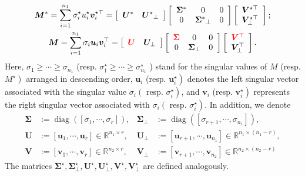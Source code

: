 \documentclass[override]{beamer} %
\theoremstyle{remark}
\newcommand{\bs}[1]{{\boldsymbol{#1}^*}}
\newcommand{\bb}[1]{{\boldsymbol {#1}}}
\def\red{\textcolor{red}}
\begin{document}
\begin{frame}
$$
\begin{gathered}
\bs M=\sum_{i=1}^{n_1} \sigma_i^{\star} u_i^{\star} \boldsymbol{v}_i^{\star \top}=\left[\begin{array}{ll}
\bs U & \bs U_{\perp}
\end{array}\right]\left[\begin{array}{ccc}
\bs \Sigma & 0 & 0 \\
0 & \bs \Sigma_{\perp}& 0
\end{array}\right]\left[\begin{array}{c}
\boldsymbol{V}^{\star \top} \\
\boldsymbol{V}_{\perp}^{\star \top}
\end{array}\right] ; \\
\bb M=\sum_{i=1}^{n_1} \sigma_i \boldsymbol{u}_i \boldsymbol{v}_i^{\top}=\left[\begin{array}{ll} \red{\bb U} & \bb U_{\perp}
\end{array}\right]\left[\begin{array}{ccc}
\red{\bb \Sigma} & 0 & 0 \\
0 & \boldsymbol{\Sigma}_{\perp} & 0
\end{array}\right]\left[\begin{array}{c}
\red{\boldsymbol{V}^{\top}} \\
\boldsymbol{V}_{\perp}^{\top}
\end{array}\right] .
\end{gathered}
$$
Here, $\sigma_1 \geq \cdots \geq \sigma_{n_1}$ (resp. $\sigma_1^{\star} \geq \cdots \geq \sigma_{n_1}^{\star}$ ) stand for the singular values of $M$ (resp. $\left.M^{\star}\right)$ arranged in descending order, $\boldsymbol{u}_i$ (resp. $\left.\boldsymbol{u}_i^{\star}\right)$ denotes the left singular vector associated with the singular value $\sigma_i\left(\right.$ resp. $\left.\sigma_i^{\star}\right)$, and $\boldsymbol{v}_i$ (resp. $\left.\boldsymbol{v}_i^{\star}\right)$ represents the right singular vector associated with $\sigma_i\left(\right.$ resp. $\left.\sigma_i^{\star}\right)$. In addition, we denote
$$
\begin{aligned}
\boldsymbol{\Sigma} &:=\operatorname{diag}\left(\left[\sigma_1, \cdots, \sigma_r\right]\right), & \boldsymbol{\Sigma}_{\perp} &:=\operatorname{diag}\left(\left[\sigma_{r+1}, \cdots, \sigma_{n_1}\right]\right), \\
\boldsymbol{U} &:=\left[\boldsymbol{u}_1, \cdots, \boldsymbol{u}_r\right] \in \mathbb{R}^{n_1 \times r}, & \boldsymbol{U}_{\perp} &:=\left[\boldsymbol{u}_{r+1}, \cdots, \boldsymbol{u}_{n_1}\right] \in \mathbb{R}^{n_1 \times\left(n_1-r\right)}, \\
\boldsymbol{V} &:=\left[\boldsymbol{v}_1, \cdots, \boldsymbol{v}_r\right] \in \mathbb{R}^{n_2 \times r}, & \boldsymbol{V}_{\perp} &:=\left[\boldsymbol{v}_{r+1}, \cdots, \boldsymbol{v}_{n_2}\right] \in \mathbb{R}^{n_2 \times\left(n_2-r\right)}
\end{aligned}
$$
The matrices $\boldsymbol{\Sigma}^{\star}, \boldsymbol{\Sigma}_{\perp}^{\star}, \boldsymbol{U}^{\star}, \boldsymbol{U}_{\perp}^{\star}, \boldsymbol{V}^{\star}, \boldsymbol{V}_{\perp}^{\star}$ are defined analogously.


\end{frame}
\end{document}
